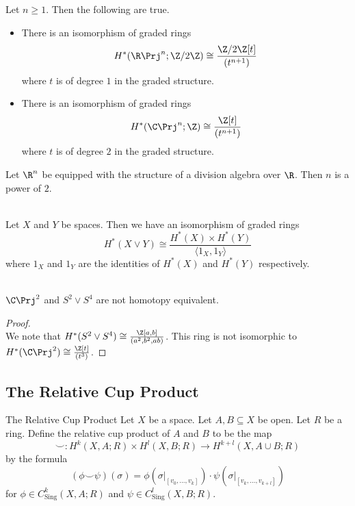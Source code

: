 \documentclass[a4paper]{article}
\begin{document}
\begin{eg}{}{} Let $n\geq 1$. Then the following are true. 
\begin{itemize}
\item There is an isomorphism of graded rings $$H^\ast(\R\Prj^n;\Z/2\Z)\cong\frac{\Z/2\Z[t]}{(t^{n+1})}$$ where $t$ is of degree $1$ in the graded structure. 
\item There is an isomorphism of graded rings $$H^\ast(\C\Prj^n;\Z)\cong\frac{\Z[t]}{(t^{n+1})}$$ where $t$ is of degree $2$ in the graded structure. 
\end{itemize}
\end{eg}

\begin{prp}{}{} Let $\R^n$ be equipped with the structure of a division algebra over $\R$. Then $n$ is a power of $2$. 
\end{prp}

\begin{prp}{}{}\\
Let $X$ and $Y$ be spaces. Then we have an isomorphism of graded rings $$H^\ast(X\vee Y)\cong\frac{H^\ast(X)\times H^\ast(Y)}{\langle 1_X,1_Y\rangle}$$ where $1_X$ and $1_Y$ are the identities of $H^\ast(X)$ and $H^\ast(Y)$ respectively. 
\end{prp}

\begin{eg}{}{}\\
$\C\Prj^2$ and $S^2\vee S^4$ are not homotopy equivalent. 
\begin{proof}\\
We note that $H^\ast(S^2\vee S^4)\cong\frac{\Z[a,b]}{(a^2,b^2,ab)}$. This ring is not isomorphic to $H^\ast(\C\Prj^2)\cong\frac{\Z[t]}{(t^3)}$. 
\end{proof}
\end{eg}

\subsection{The Relative Cup Product}
\begin{defn}{The Relative Cup Product}{} Let $X$ be a space. Let $A,B\subseteq X$ be open. Let $R$ be a ring. Define the relative cup product of $A$ and $B$ to be the map $$\smile:H^k(X,A;R)\times H^l(X,B;R)\to H^{k+l}(X,A\cup B;R)$$ by the formula $$(\phi\smile\psi)(\sigma)=\phi(\sigma|_{[v_0,\dots,v_k]})\cdot\psi(\sigma|_{[v_k,\dots,v_{k+l}]})$$ for $\phi\in C_\text{Sing}^k(X,A;R)$ and $\psi\in C_\text{Sing}^l(X,B;R)$. 
\end{defn}
\end{document}
